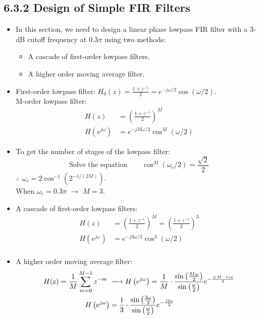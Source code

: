 \documentclass[onecolumn,oneside]{SUSTechHomework}
\begin{document}
\subsection*{6.3.2 Design of Simple FIR Filters}
\begin{info}
\begin{itemize}
    \item In this section, we need to design a linear phase lowpass FIR filter with a 3-dB cutoff frequency at $0.3\pi$ using two methods:
    \begin{itemize}
        \item A cascade of first-order lowpass filters.
        \item A higher order moving average filter.
    \end{itemize}
    \item First-order lowpass filter: $H_{0}(z)=\frac{1+z^{-1}}{2}=e^{-j \omega / 2} \cos (\omega / 2)$. \\
    M-order lowpass filter: 
    $$
    \begin{aligned}
        H(z)&=\left(\frac{1+z^{-1}}{2}\right)^M\\
        H(e^{j\omega})&=e^{-j M\omega / 2} \cos ^M(\omega / 2)
    \end{aligned}
    $$ 
\end{itemize}
\end{info}
\begin{info}
    \begin{itemize}
        \item To get the number of stages of the lowpass filter:
        $$
        \text{Solve the equation} \qquad \cos ^M(\omega_c / 2) = \frac{\sqrt{2}}{2}
        $$
        $\therefore$ $\omega_{c}=2 \cos ^{-1}\left(2^{-1 /(2 M)}\right)$.\\
        When $\omega_c=0.3\pi$ $\rightarrow$ $M=3$.
        \item A cascade of first-order lowpass filters: 
        $$
        \begin{aligned}
            H(z)&=\left(\frac{1+z^{-1}}{2}\right)^M=\left(\frac{1+z^{-1}}{2}\right)^3\\
            H(e^{j\omega})&=e^{-j 3\omega / 2} \cos ^3(\omega / 2)\\
        \end{aligned}
        $$
        \item A higher order moving average filter:
        $$
        \begin{aligned}
            H(\mathrm{z})=\frac{1}{M} \sum_{m=0}^{M-1} z^{-m}\ &\xlongrightarrow\ H\left(e^{j \omega}\right)=\frac{1}{M} \cdot \frac{\sin \left(\frac{M \omega}{2}\right)}{\sin \left(\frac{\omega}{2}\right)} e^{-\frac{j(M-1) \omega}{2}}
            \\ H\left(e^{j \omega}\right)
            &=\frac{1}{3} \cdot \frac{\sin \left(\frac{3 \omega}{2}\right)}{\sin \left(\frac{\omega}{2}\right)} e^{-\frac{j2 \omega}{2}}
        \end{aligned}
        $$
    \end{itemize}
\end{info}
\end{document}
